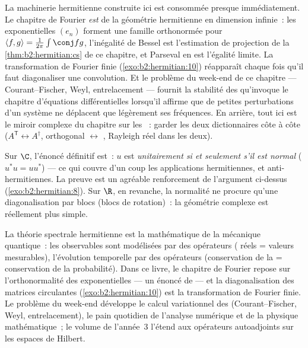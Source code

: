 \begin{remark}
La machinerie hermitienne construite ici est consommée presque
immédiatement. Le chapitre de Fourier \emph{est} de la géométrie
hermitienne en dimension infinie~: les exponentielles $(e_n)$ forment
une famille orthonormée pour $\langle f, g\rangle =
\frac{1}{2\pi}\int\conj fg$, l'inégalité de Bessel est l'estimation de
projection de la \cref{thm:b2:hermitian:cs} de ce chapitre, et
Parseval en est l'égalité limite. La transformation de Fourier finie
(\cref{exo:b2:hermitian:10}) réapparaît chaque fois qu'il faut
diagonaliser une convolution. Et le problème du week-end de ce
chapitre --- Courant--Fischer, Weyl, entrelacement --- fournit la
stabilité des  qu'invoque le chapitre d'équations
différentielles lorsqu'il affirme que de petites perturbations d'un
système ne déplacent que légèrement ses fréquences. En arrière, tout
ici est le miroir complexe du chapitre sur les ~:
garder les deux dictionnaires côte à côte ($A^{\mathsf T}
\leftrightarrow A^\dagger$, orthogonal $\leftrightarrow$ ,
Rayleigh réel dans les deux).
\end{remark}

\begin{remark}
Sur $\C$, l'énoncé définitif est~: $u$ est \emph{unitairement
 si et seulement s'il est normal} ($u^*u = uu^*$) ---
ce qui couvre d'un coup les applications hermitiennes,  et
anti-hermitiennes. La preuve est un agréable renforcement de
l'argument ci-dessus (\cref{exo:b2:hermitian:8}). Sur $\R$, en
revanche, la normalité ne procure qu'une diagonalisation par blocs
(blocs de rotation)~: la géométrie complexe est réellement plus
simple.
\end{remark}

\begin{remark}
La théorie spectrale hermitienne est la mathématique de la mécanique
quantique~: les observables sont modélisées par des opérateurs
 ( réels = valeurs mesurables), l'évolution
temporelle par des opérateurs  (conservation de la  =
conservation de la probabilité). Dans ce livre, le chapitre de
Fourier repose sur l'orthonormalité des exponentielles --- un énoncé
de  --- et la diagonalisation des matrices
circulantes (\cref{exo:b2:hermitian:10}) est la transformation de
Fourier finie. Le problème du week-end développe le calcul
variationnel des  (Courant--Fischer, Weyl,
entrelacement), le pain quotidien de l'analyse numérique et de la
physique mathématique~; le volume de l'année~3 l'étend aux opérateurs
autoadjoints  sur les espaces de Hilbert.
\end{remark}

